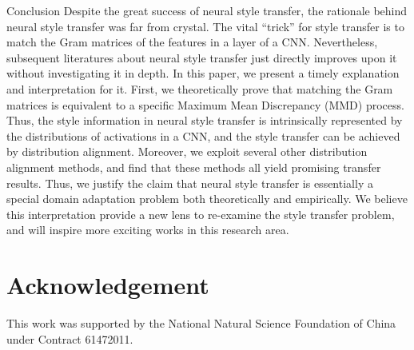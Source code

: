 \documentclass{article}
\begin{document}
\begin{section}{Conclusion}
Despite the great success of neural style transfer, the rationale behind neural style transfer was far from crystal. The vital ``trick'' for style transfer is to match the Gram matrices of the features in a layer of a CNN. Nevertheless, subsequent literatures about neural style transfer just directly improves upon it without investigating it in depth. In this paper, we present a timely explanation and interpretation for it. First, we theoretically prove that matching the Gram matrices is equivalent to a specific Maximum Mean Discrepancy (MMD) process. Thus, the style information in neural style transfer is intrinsically represented by the  distributions of activations in a CNN, and the style transfer can be achieved by distribution alignment. Moreover, we exploit several other distribution alignment methods, and find that these methods all yield promising transfer results. Thus, we justify the claim that neural style transfer is essentially a special domain adaptation problem both theoretically and empirically. We believe this interpretation provide a new lens to re-examine the style transfer problem, and will inspire more exciting works in this research area.



\end{section}


\section*{Acknowledgement} This work was supported by the National Natural Science Foundation of China under Contract 61472011.



{


}
\end{document}

